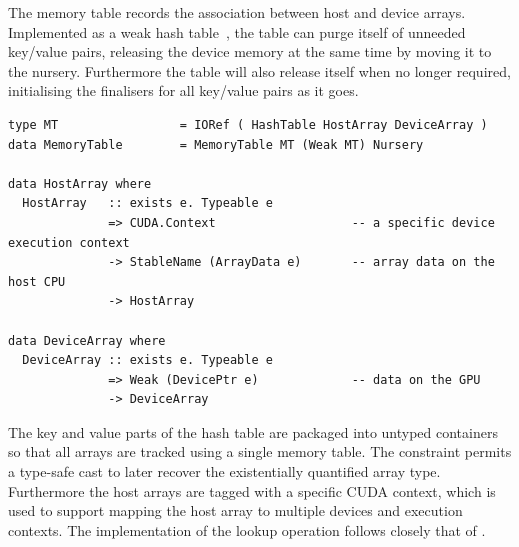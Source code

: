 The memory table records the association between host and device arrays.
Implemented as a weak hash table~\cite{PeytonJones:2000ks}, the table can purge
itself of unneeded key/value pairs, releasing the device memory at the same time
by moving it to the nursery. Furthermore the table will also release itself when
no longer required, initialising the finalisers for all key/value pairs as it
goes.
%
\begin{lstlisting}[style=haskell]
type MT                 = IORef ( HashTable HostArray DeviceArray )
data MemoryTable        = MemoryTable MT (Weak MT) Nursery

data HostArray where
  HostArray   :: exists e. Typeable e
              => CUDA.Context                   -- a specific device execution context
              -> StableName (ArrayData e)       -- array data on the host CPU
              -> HostArray

data DeviceArray where
  DeviceArray :: exists e. Typeable e
              => Weak (DevicePtr e)             -- data on the GPU
              -> DeviceArray
\end{lstlisting}
%
The key and value parts of the hash table are packaged into untyped containers
so that all arrays are tracked using a single memory table. The 
constraint permits a type-safe cast to later recover the existentially
quantified array type. Furthermore the host arrays are tagged with a specific
CUDA context, which is used to support mapping the host array to multiple
devices and execution contexts. The implementation of the lookup operation
follows closely that of \citet{PeytonJones:2000ks}.

